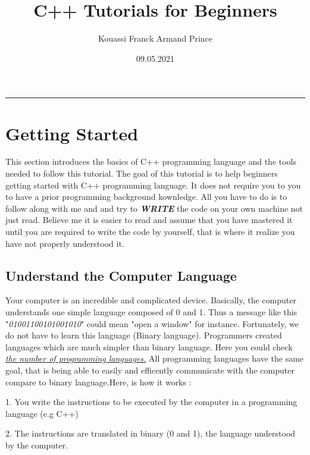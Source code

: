 \documentclass[11pt, a4paper]{article}
\title{C++ Tutorials for Beginners}
\author{Kouassi Franck Armand Prince
\date{09.05.2021}
}
\begin{document}
\maketitle\hrule
\newpage

\tableofcontents
\listoffigures
\lstlistoflistings
\pagebreak

\section{Getting Started}
This section introduces the basics of C++ programming language and the tools
needed to follow this tutorial. The goal of this tutorial is to help beginners
getting started with C++ programming language. It does not require you to you to
have a prior programming background kownledge. All you have to do is to follow along
with me and and try to \textbf{\textit{WRITE}} the code on your own machine not just read.
Believe me it is easier to read and assume that you have mastered it until you are required
to write the code by yourself, that is where it realize you have not properly understood it.

\subsection{Understand the Computer Language}
Your computer is an incredible and complicated device. Basically, the computer
understands one simple language composed of 0 and 1. Thus a message like this
"\textit{01001100101001010}" could mean "open a window" for instance. Fortunately, we do not have
to learn this language (Binary language). Programmers created languages which are much simpler
than binary language. Here you could check \href{https://en.wikipedia.org/wiki/List_of_programming_languages}
{\emph{\textit{the number of programming languages.}}} \newline
All programming languages have the same goal, that is being able to easily and efficently
communicate with the computer compare to binary language.\newline Here, is how it works :

1. You write the instructions to be executed by the computer in a programming language (e.g C++)

2. The instructions are translated in binary (0 and 1), the language understood by the computer.
\end{document}
